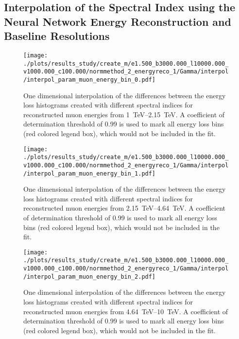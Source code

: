 %

\subsection*{Interpolation of the Spectral Index using the Neural Network Energy Reconstruction and Baseline Resolutions}

\begin{figure}[H]
    \centering
    \texttt{[image: ./plots/results\_study/create\_m/e1.500\_b3000.000\_l10000.000\_v1000.000\_c100.000/normmethod\_2\_energyreco\_1/Gamma/interpol/interpol\_param\_muon\_energy\_bin\_0.pdf]}
    \caption{One dimensional interpolation of the differences between the energy loss histograms created with different spectral indices for reconstructed muon energies from \SIrange{1}{2.15}{TeV}. A coefficient of determination threshold of \num{0.99} is used to mark all energy loss bins (red colored legend box), which would not be included in the fit.}
    \label{fig:study_1d_interpol_mu0_nn_low_gamma}
\end{figure}

\begin{figure}[H]
    \centering
    \texttt{[image: ./plots/results\_study/create\_m/e1.500\_b3000.000\_l10000.000\_v1000.000\_c100.000/normmethod\_2\_energyreco\_1/Gamma/interpol/interpol\_param\_muon\_energy\_bin\_1.pdf]}
    \caption{One dimensional interpolation of the differences between the energy loss histograms created with different spectral indices for reconstructed muon energies from \SIrange{2.15}{4.64}{TeV}. A coefficient of determination threshold of \num{0.99} is used to mark all energy loss bins (red colored legend box), which would not be included in the fit.}
    \label{fig:study_1d_interpol_mu1_nn_low_gamma}
\end{figure}

\begin{figure}[H]
    \centering
    \texttt{[image: ./plots/results\_study/create\_m/e1.500\_b3000.000\_l10000.000\_v1000.000\_c100.000/normmethod\_2\_energyreco\_1/Gamma/interpol/interpol\_param\_muon\_energy\_bin\_2.pdf]}
    \caption{One dimensional interpolation of the differences between the energy loss histograms created with different spectral indices for reconstructed muon energies from \SIrange{4.64}{10}{TeV}. A coefficient of determination threshold of \num{0.99} is used to mark all energy loss bins (red colored legend box), which would not be included in the fit.}
    \label{fig:study_1d_interpol_mu2_nn_low_gamma}
\end{figure}


